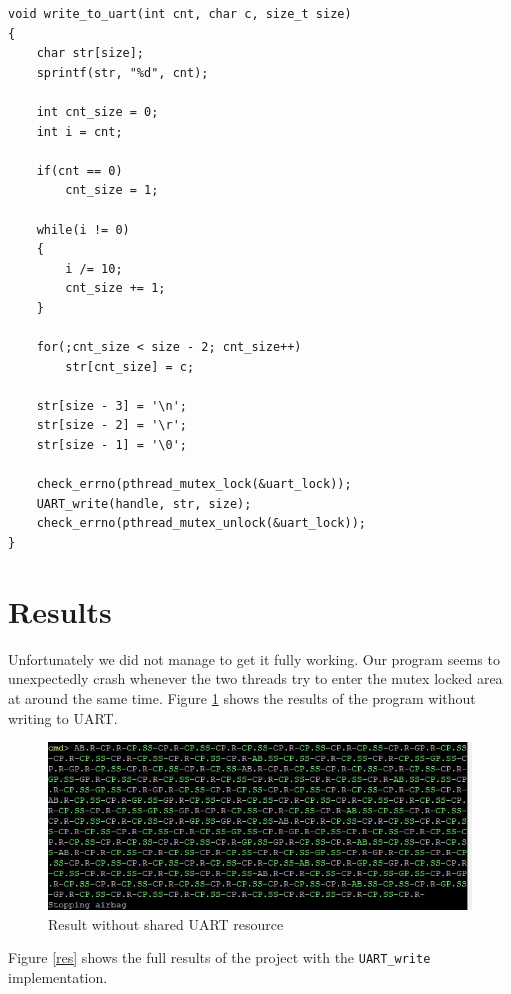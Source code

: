 \documentclass[10pt]{article}
\begin{document}
\begin{lstlisting}[style=CStyle, caption={Write to UART implementation}, captionpos=b, label={lst:uart}, escapechar=@]
void write_to_uart(int cnt, char c, size_t size)
{
    char str[size];
    sprintf(str, "%d", cnt);

    int cnt_size = 0;
    int i = cnt;

    if(cnt == 0)
        cnt_size = 1;

    while(i != 0)
    {
        i /= 10;
        cnt_size += 1;
    }

    for(;cnt_size < size - 2; cnt_size++)
        str[cnt_size] = c;

    str[size - 3] = '\n';
    str[size - 2] = '\r';
    str[size - 1] = '\0';

    check_errno(pthread_mutex_lock(&uart_lock));
    UART_write(handle, str, size);
    check_errno(pthread_mutex_unlock(&uart_lock));
}
\end{lstlisting}

\newpage

\section*{Results}

Unfortunately we did not manage to get it fully working. Our program seems to unexpectedly crash
whenever the two threads try to enter the mutex locked area at around the same time. Figure \ref{resNoUART}
shows the results of the program without writing to UART.

\begin{figure}[H]
\caption{Result without shared UART resource}
\label{resNoUART}
\centering
\includegraphics[width=0.9\linewidth]{./images/result_no_uart.jpeg}
\end{figure}

Figure \ref{res} shows the full results of the project with the \texttt{UART\_write} implementation.
\end{document}
